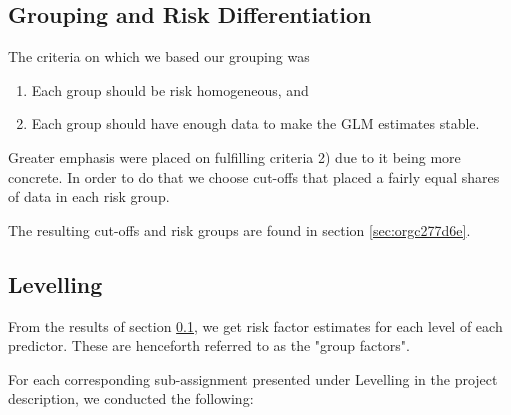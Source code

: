 \documentclass[11pt]{article}
\begin{document}
\subsection{Grouping and Risk Differentiation}
\label{sec:orgc57fe0b}

The criteria on which we based our grouping was

\begin{enumerate}
\item Each group should be risk homogeneous, and
\item Each group should have enough data to make the GLM estimates stable.
\end{enumerate}
Greater emphasis were placed on fulfilling criteria 2) due to it being more concrete. In order to do that
we choose cut-offs that placed a fairly equal shares of data in each risk group. 

The resulting cut-offs and risk groups are found in section \ref{sec:orgc277d6e}.

\subsection{Levelling}
\label{sec:orgb763a92}

From the results of section \ref{sec:orgc57fe0b}, we get risk factor estimates for each
level of each predictor. These are henceforth referred to as the "group factors".

For each corresponding sub-assignment presented under Levelling in the project description, we conducted the
following:
\end{document}
